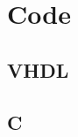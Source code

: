 \documentclass[11pt, a4paper, x11names]{report}
\begin{document}


\renewcommand{\baselinestretch}{1.5}\normalsize
	\tableofcontents
\renewcommand{\baselinestretch}{1.3}\normalsize 


% 
 
 
 


\chapter{Code}

\section{VHDL}
	

\section{C}
	
\end{document}
